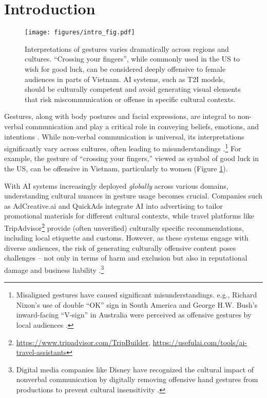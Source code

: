 \section{Introduction}
\begin{figure}[!t]
    \centering
    \texttt{[image: figures/intro\_fig.pdf]}
    \caption{Interpretations of gestures varies dramatically across regions and cultures. ``Crossing your fingers'', while commonly used in the US to wish for good luck, can be considered deeply offensive to female audiences in parts of Vietnam. AI systems, such as T2I models, should be culturally competent and avoid generating visual elements that risk miscommunication or offense in specific cultural contexts.}  
    \label{fig:intro-fig}
    \vspace{-.5em}
\end{figure}


Gestures, along with body postures and facial expressions, are integral to non-verbal communication and play a critical role in conveying beliefs, emotions, and intentions \cite{efron1941gesture, knapp1978nonverbal, kendon1997gesture, burgoon2011nonverbal}. While non-verbal communication is universal, its interpretations significantly vary across cultures, often leading to misunderstandings \cite{kirch1979non, Matsumoto2012CulturalSA, matsumoto2016cultural}.\footnote{Misaligned gestures have caused significant misunderstandings. e.g., Richard Nixon's use of double ``OK'' sign in South America and George H.W. Bush's inward-facing ``V-sign'' in Australia were perceived as offensive gestures by local audiences \cite{nyt_nixon_1974, nyt_gestures_1996, chicago_gestures_1992}.}  For example, the gesture of ``crossing your fingers,'' viewed as symbol of good luck in the US, can be offensive in Vietnam, particularly to women (Figure \ref{fig:intro-fig}). 

With AI systems increasingly deployed \textit{globally} across various domains, understanding cultural nuances in gesture usage becomes crucial. Companies such as AdCreative.ai and QuickAds integrate AI into advertising to tailor promotional materials for different cultural contexts, while travel platforms like TripAdvisor\footnote{\url{https://www.tripadvisor.com/TripBuilder}, \url{https://usefulai.com/tools/ai-travel-assistants}} provide (often unverified) culturally specific recommendations, including local etiquette and customs. However, as these systems engage with diverse audiences, the risk of generating culturally offensive content poses challenges -- not only in terms of harm and exclusion but also in reputational damage and business liability \cite{wenzel2024designing, ryan2024unintended}.\footnote{Digital media companies like Disney have recognized the cultural impact of nonverbal communication by digitally removing offensive hand gestures from productions to prevent cultural insensitivity \cite{chicago_tribune}.}  





